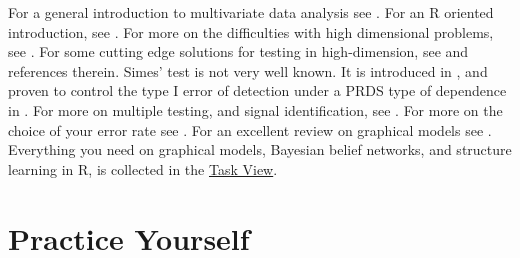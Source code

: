 \documentclass[]{book}
\theoremstyle{definition}
\theoremstyle{definition}
\theoremstyle{definition}
\theoremstyle{remark}
\begin{document}
For a general introduction to multivariate data analysis see
\citet{anderson2004introduction}. For an R oriented introduction, see
\citet{everitt2011introduction}. For more on the difficulties with high
dimensional problems, see \citet{bai1996effect}. For some cutting edge
solutions for testing in high-dimension, see
\citet{rosenblatt2016better} and references therein. Simes' test is not
very well known. It is introduced in \citet{simes1986improved}, and
proven to control the type I error of detection under a PRDS type of
dependence in \citet{benjamini2001control}. For more on multiple
testing, and signal identification, see \citet{efron2012large}. For more
on the choice of your error rate see \citet{rosenblatt2013practitioner}.
For an excellent review on graphical models see
\citet{kalisch2014causal}. Everything you need on graphical models,
Bayesian belief networks, and structure learning in R, is collected in
the \href{https://cran.r-project.org/web/views/gR.html}{Task View}.

\section{Practice Yourself}\label{practice-yourself-5}
\end{document}
